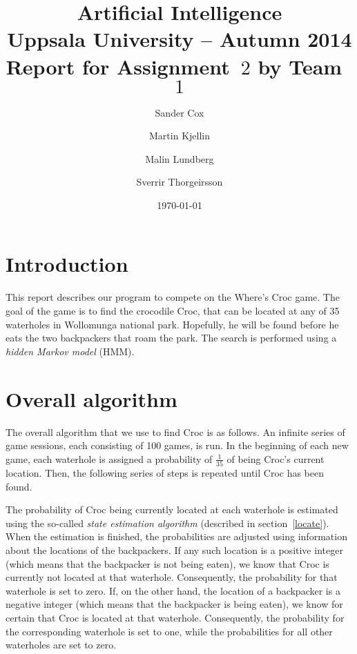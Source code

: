 \documentclass[a4paper]{article}
\title{\textbf{Artificial Intelligence \\
    Uppsala University -- Autumn 2014 \\
    Report for Assignment~$2$
    by Team~$1$
  }
}
\author{Sander Cox \and Martin Kjellin \and Malin Lundberg \and Sverrir
  Thorgeirsson}
\date{\today}
\begin{document}
\maketitle

\section{Introduction}

This report describes our program to compete
on the Where's Croc game. The goal of the game is to find the crocodile Croc,
that can be located at any of 35 waterholes in Wollomunga national
park. Hopefully, he will be found before he eats the two backpackers that roam
the park. The search is performed using a \emph{hidden Markov model}
(HMM).

\section{Overall algorithm}
\label{overall}

The overall algorithm that we use to find Croc is as follows. An infinite series of
game sessions, each consisting of 100 games, is run. In the beginning of each new
game, each waterhole is assigned a probability of $\frac{1}{35}$ of being Croc's
current location. Then, the
following series of steps is repeated until Croc has been found.

The probability of Croc being currently located at each waterhole is estimated using the so-called \emph{state estimation algorithm} (described in
section~\ref{locate}). %
When the estimation is finished, the probabilities are adjusted using
information about the locations of the backpackers. If any such location is a
positive integer (which means that the backpacker is not being eaten), we know
that Croc is currently not located at that waterhole. Consequently, the
probability for that waterhole is set to zero. If, on the other hand, the
location of a backpacker is a negative integer (which means that the backpacker is
being eaten), we know for certain that Croc is located at that waterhole. Consequently, the
probability for the corresponding waterhole is set to one, while the
probabilities for all other waterholes are set to zero.
\end{document}
